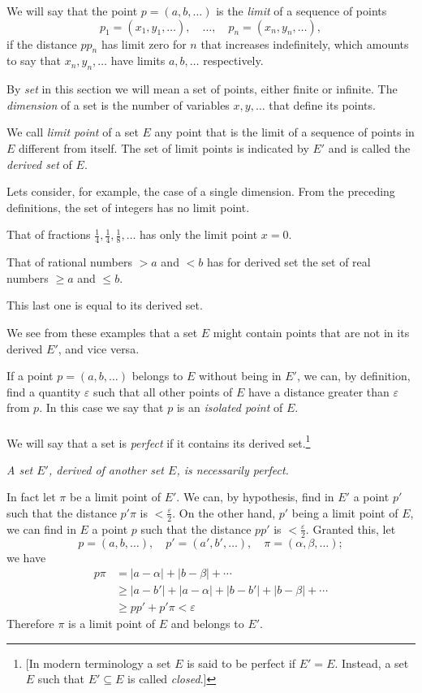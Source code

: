 \documentclass[10pt,letterpaper]{book}
\renewcommand\epsilon{\varepsilon}
\theoremstyle{definition}
\begin{document}
We will say that the point $p=(a,b,\dots)$ is the \textit{limit} of a sequence of points
\[
  p_1=(x_1,y_1,\dots),
  \quad\dots,\quad
  p_n=(x_n,y_n,\dots),
\]
if the distance $pp_n$ has limit zero for $n$ that increases indefinitely, which amounts to say that $x_n,y_n,\dots$ have limits $a,b,\dots$ respectively.


By \textit{set} in this section we will mean a set of points, either finite or infinite. The \textit{dimension} of a set is the number of variables $x, y, \dots$ that define its points.

We call \textit{limit point} of a set $E$ any point that is the limit of a sequence of points in $E$ different from itself. The set of limit points is indicated by $E'$ and is called the \textit{derived set} of $E$.

Lets consider, for example, the case of a single dimension. From the preceding definitions, the set of integers has no limit point.

That of fractions $\frac 1 4,\frac 1 4, \frac 1 8,\dots$ has only the limit point $x=0$.

That of rational numbers $>a$ and $<b$ has for derived set the set of real numbers $\geq a$ and $\leq b$.

This last one is equal to its derived set.

We see from these examples that a set $E$ might contain points that are not in its derived $E'$, and vice versa.

If a point $p=(a,b,\dots)$ belongs to $E$ without being in $E'$, we can, by definition, find a quantity $\epsilon$ such that all other points of $E$ have a distance greater than $\epsilon$ from $p$. In this case we say that $p$ is an \textit{isolated point} of $E$.

\paragraph{} We will say that a set is \textit{perfect} if it contains its derived set.\footnote{[In modern terminology a set $E$ is said to be perfect if $E'=E$. Instead, a set $E$ such that $E'\subseteq E$ is called \textit{closed}.]}

\textit{A set $E'$, derived of another set $E$, is necessarily perfect.}

In fact let $\pi$ be a limit point of $E'$. We can, by hypothesis, find in $E'$ a point $p'$ such that the distance $p'\pi$ is $<\frac\epsilon 2$. On the other hand, $p'$ being a limit point of $E$, we can find in $E$ a point $p$ such that the distance $pp'$ is $<\frac\epsilon 2$. Granted this, let
\[
  p=(a,b,\dots),\quad p'=(a',b',\dots),\quad \pi=(\alpha,\beta,\dots);
\]
we have
\begin{align*}
  p\pi &=    |a-\alpha| + |b-\beta| + \cdots \\
       &\geq |a-b'| + |a-\alpha| + |b-b'| + |b-\beta| + \cdots \\
       &\geq pp' + p'\pi < \epsilon
\end{align*}
Therefore $\pi$ is a limit point of $E$ and belongs to $E'$.

\begin{thebibliography}{9}

\end{thebibliography}
\end{document}
